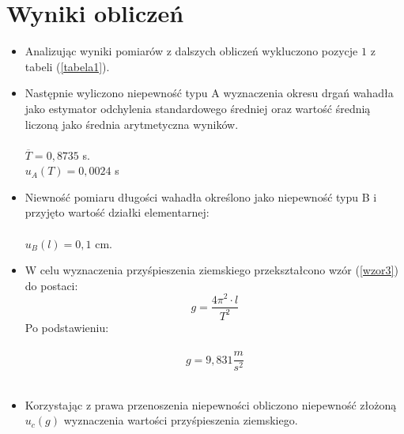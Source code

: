 \documentclass{article}
\begin{document}

\section{Wyniki obliczeń}
 \begin{itemize}
	\item Analizując wyniki pomiarów z dalszych obliczeń wykluczono pozycje $1$ z tabeli (\ref{tabela1}).
		
	\item Następnie wyliczono niepewność typu A wyznaczenia okresu drgań wahadła jako estymator odchylenia standardowego średniej oraz wartość
	średnią liczoną jako średnia arytmetyczna wyników.\\\\
	 $\overline{T} = 0,8735$ s.\\ %
	 $u_A(T) = 0,0024$ s
	

	\item Niewność pomiaru długości wahadła określono jako niepewność typu B i przyjęto wartość działki elementarnej: \\\\ %
		$u_B(l) = 0,1$ cm.\\ %
		
	\item W celu wyznaczenia przyśpieszenia ziemskiego przekształcono wzór (\ref{wzor3}) do postaci:
		\begin{equation}
			g = \frac{4\pi^2\cdot l}{T^2}
		\end{equation}
		Po podstawieniu:\\\\
		\[ g = 9,831 \frac{m}{s^2} \]\\
		 
		
	\item Korzystając z prawa przenoszenia niepewności obliczono niepewność złożoną $u_c(g)$ wyznaczenia wartości przyśpieszenia ziemskiego.
		

\end{itemize}
\end{document}
